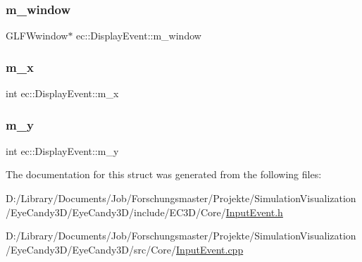 \mbox{\label{structec_1_1_display_event_a501ab5209368544f1c264b3e25a87185}} 
\subsubsection{\texorpdfstring{m\+\_\+window}{m\_window}}
{\footnotesize\ttfamily G\+L\+F\+Wwindow$\ast$ ec\+::\+Display\+Event\+::m\+\_\+window}

\mbox{\label{structec_1_1_display_event_a35b371c7098cc98509f44e6fe2802945}} 
\subsubsection{\texorpdfstring{m\+\_\+x}{m\_x}}
{\footnotesize\ttfamily int ec\+::\+Display\+Event\+::m\+\_\+x}

\mbox{\label{structec_1_1_display_event_aa4314e0538f9929b39e37bb400ac2220}} 
\subsubsection{\texorpdfstring{m\+\_\+y}{m\_y}}
{\footnotesize\ttfamily int ec\+::\+Display\+Event\+::m\+\_\+y}



The documentation for this struct was generated from the following files\+:\begin{DoxyCompactItemize}
\item 
D\+:/\+Library/\+Documents/\+Job/\+Forschungsmaster/\+Projekte/\+Simulation\+Visualization/\+Eye\+Candy3\+D/\+Eye\+Candy3\+D/include/\+E\+C3\+D/\+Core/\mbox{\hyperlink{_input_event_8h}{Input\+Event.\+h}}\item 
D\+:/\+Library/\+Documents/\+Job/\+Forschungsmaster/\+Projekte/\+Simulation\+Visualization/\+Eye\+Candy3\+D/\+Eye\+Candy3\+D/src/\+Core/\mbox{\hyperlink{_input_event_8cpp}{Input\+Event.\+cpp}}\end{DoxyCompactItemize}

